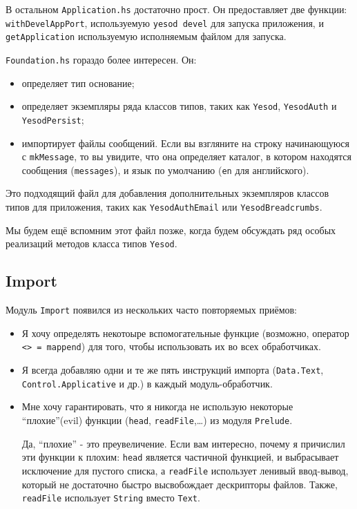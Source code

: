 В остальном \lstinline!Application.hs! достаточно прост. Он предоставляет две функции:
\lstinline!withDevelAppPort!, используемую \lstinline!yesod devel! для запуска приложения,
и \lstinline!getApplication! используемую исполняемым файлом для запуска.

\lstinline!Foundation.hs! гораздо более интересен. Он:
\begin{itemize}
  \item определяет тип основание;
  \item определяет экземпляры ряда классов типов, таких как \lstinline!Yesod!, \lstinline!YesodAuth! и \lstinline!YesodPersist!;
  \item импортирует файлы сообщений. Если вы взгляните на строку начинающуюся с \lstinline!mkMessage!,
    то вы увидите, что она определяет каталог, в котором находятся сообщения (\lstinline!messages!),
    и язык по умолчанию (\lstinline!en! для английского).
\end{itemize}

Это подходящий файл для добавления дополнительных экземпляров классов типов для приложения,
таких как \lstinline!YesodAuthEmail! или \lstinline!YesodBreadcrumbs!.

Мы будем ещё вспомним этот файл позже, когда будем обсуждать ряд особых реализаций
методов класса типов \lstinline!Yesod!.

\subsection{Import}

Модуль \lstinline!Import! появился из нескольких часто повторяемых приёмов:

\begin{itemize}
  \item Я хочу определять некотоыре вспомогательные функцие (возможно, оператор \lstinline!<> = mappend!)
для того, чтобы использовать их во всех обработчиках.
  \item Я всегда добавляю одни и те же пять инструкций импорта  (\lstinline!Data.Text!, \lstinline!Control.Applicative! и др.) в каждый модуль-обработчик.
  \item Мне хочу гарантировать, что я никогда не использую некоторые ``плохие''(evil) функции (\lstinline!head!,
\lstinline!readFile!,\ldots) из модуля \lstinline!Prelude!.
    \begin{remark}
      Да, ``плохие'' - это преувеличение. Если вам интересно, почему я причислил эти функции к плохим:
      \lstinline!head! является частичной функцией, и выбрасывает исключение для пустого списка,
      а \lstinline!readFile! использует ленивый ввод-вывод, который не достаточно быстро
      высвобождает дескрипторы файлов. Также, \lstinline!readFile! использует \lstinline!String! вместо
      \lstinline!Text!.
    \end{remark}
\end{itemize}

